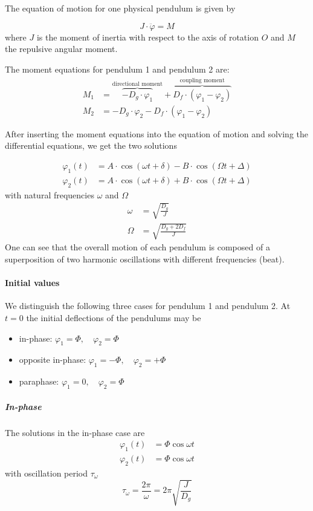 \documentclass{scrreprt}
\renewcommand{\phi}{\varphi}
\begin{document}
The equation of motion for one physical pendulum is given by

\begin{equation}
J\cdot \ddot{\phi} = M
\end{equation}
where $J$ is the moment of inertia with respect to the axis of rotation $O$ and $M$ the repulsive angular moment.

The moment equations for pendulum 1 and pendulum 2 are:
\begin{align}
M_1 &= \overbrace{-D_g\cdot \phi_1}^{\text{directional moment}} + \overbrace{D_f \cdot (\phi_1 - \phi_2)}^{\text{coupling moment}}  \\
M_2 &= -D_g\cdot \phi_2 - D_f \cdot (\phi_1 - \phi_2)
\end{align}

After inserting the moment equations into the equation of motion and solving the differential equations, we get the two solutions

\begin{align}
\phi_1(t) &= A \cdot \cos{(\omega t + \delta)} - B \cdot \cos{(\Omega t + \Delta)}\\
\phi_2(t) &= A \cdot \cos{(\omega t + \delta)} + B \cdot \cos{(\Omega t + \Delta)}
\end{align}
with natural frequencies $\omega$ and $\Omega$
\begin{align}
\omega &= \sqrt{\frac{D_g}{J}}\\
\Omega &= \sqrt{\frac{D_g+2 D_f}{J}}
\end{align}
One can see that the overall motion of each pendulum is composed of a superposition of two harmonic oscillations with different frequencies (beat).

\paragraph{Initial values}
We distinguish the following three cases for pendulum 1 and pendulum 2. At $t=0$ the initial deflections of the pendulums may be
\begin{itemize}
\item in-phase: $\phi_1 = \Phi, \quad \phi_2 = \Phi$
\item opposite in-phase: $\phi_1 = -\Phi, \quad \phi_2 = +\Phi$
\item paraphase: $\phi_1 = 0, \quad \phi_2 = \Phi$
\end{itemize}

\subparagraph*{In-phase}
The solutions in the in-phase case are
\begin{align}
\phi_1(t) &= \Phi \cos{\omega t}\\
\phi_2(t) &= \Phi \cos{\omega t}
\end{align}
with oscillation period $\tau_{\omega}$
\begin{equation}
\tau_{\omega} = \frac{2 \pi}{\omega} = 2 \pi \sqrt{\frac{J}{D_g}}
\end{equation}
\end{document}
